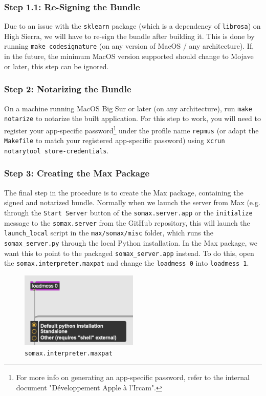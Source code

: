 \subsubsection{Step 1.1: Re-Signing the Bundle}
Due to an issue with the \texttt{sklearn} package (which is a dependency of \texttt{librosa}) on High Sierra, we will have to re-sign the bundle after building it. This is done by running \texttt{make codesignature} (on any version of MacOS / any architecture). If, in the future, the minimum MacOS version supported should change to Mojave or later, this step can be ignored.

\subsubsection{Step 2: Notarizing the Bundle}
On a machine running MacOS Big Sur or later (on any architecture), run \texttt{make notarize} to notarize the built application. For this step to work, you will need to register your app-specific password\footnote{For more info on generating an app-specific password, refer to the internal document "Développement Apple à l’Ircam".} under the profile name \texttt{repmus} (or adapt the \texttt{Makefile} to match your registered app-specific password) using \texttt{xcrun notarytool store-credentials}.

\subsubsection{Step 3: Creating the Max Package}
The final step in the procedure is to create the Max package, containing the signed and notarized bundle. Normally when we launch the server from Max (e.g. through the \texttt{Start Server} button of the \texttt{somax.server.app} or the \texttt{initialize} message to the \texttt{somax.server} from the GitHub repository, this will launch the \texttt{launch\_local} script in the \texttt{max/somax/misc} folder, which runs the \texttt{somax\_server.py} through the local Python installation. In the Max package, we want this to point to the packaged \texttt{somax\_server.app} instead. To do this, open the \texttt{somax.interpreter.maxpat} and change the \texttt{loadmess 0} into \texttt{loadmess 1}.

\begin{figure}[h!]
    \centering        
 	\includegraphics[width=0.5\textwidth, keepaspectratio]{figures/somax_interpreter.png}
    \caption{\texttt{somax.interpreter.maxpat}}
    \label{fig:myFig}
\end{figure}


